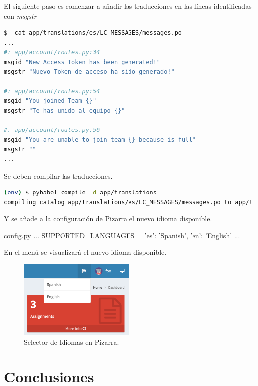 \documentclass[11pt,spanish,listoffigures,listoftables]{tfgetsinf}
\begin{document}
El siguiente paso es comenzar a añadir las traducciones en las líneas identificadas con \textit{msgstr}

\begin{lstlisting}[language=bash]
$  cat app/translations/es/LC_MESSAGES/messages.po
...
#: app/account/routes.py:34
msgid "New Access Token has been generated!"
msgstr "Nuevo Token de acceso ha sido generado!"

#: app/account/routes.py:54
msgid "You joined Team {}"
msgstr "Te has unido al equipo {}"

#: app/account/routes.py:56
msgid "You are unable to join team {} because is full"
msgstr ""
...
\end{lstlisting}

Se deben compilar las traducciones.

\begin{lstlisting}[language=bash]
(env) $ pybabel compile -d app/translations
compiling catalog app/translations/es/LC_MESSAGES/messages.po to app/translations/es/LC_MESSAGES/messages.mo
\end{lstlisting}

Y se añade a la configuración de Pizarra el nuevo idioma disponible.

\begin{code}{config.py}
	...
	SUPPORTED_LANGUAGES = {'es': 'Spanish', 'en': 'English'}
	...
\end{code}

En el menú se visualizará el nuevo idioma disponible.

\begin{figure}[ht]
	\centering
	\includegraphics[width=0.50\textwidth]{img/pizarra-new-language}
	\caption[Selector de Idiomas en Pizarra]{Selector de Idiomas en Pizarra.}
	\label{figura:pizarra-new-language}
\end{figure}




\chapter{Conclusiones}
\end{document}
